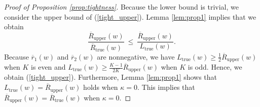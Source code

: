 \documentclass[12pt,a4paper]{article}
\begin{document}
\begin{proof}[Proof of Proposition \ref{prop:tightness}]
Because the lower bound is trivial, we consider the upper bound of (\ref{tight_upper}). Lemma \ref{lem:prop1} implies that we obtain
\begin{equation*}
\frac{\overline{R}_{\mathrm{upper}}(w)}{\overline{R}_{\mathrm{true}}(w)} \ \leq \ \frac{\overline{R}_{\mathrm{upper}}(w)}{L_{\mathrm{true}}(w)}.
\end{equation*}
Because $\overline{r}_1(w)$ and $\overline{r}_2(w)$ are nonnegative, we have $L_{\mathrm{true}}(w) \geq \frac{1}{2} \overline{R}_{\mathrm{upper}}(w)$ when $K$ is even and $L_{\mathrm{true}}(w) \geq \frac{K-1}{2K} \overline{R}_{\mathrm{upper}}(w)$ when $K$ is odd. Hence, we obtain (\ref{tight_upper}). Furthermore, Lemma \ref{lem:prop1} shows that $L_{\mathrm{true}}(w) = \overline{R}_{\mathrm{upper}}(w)$ holds when $\kappa = 0$. This implies that $\overline{R}_{\mathrm{upper}}(w) = \overline{R}_{\mathrm{true}}(w)$ when $\kappa = 0$.
\end{proof}\vspace{0.1in}
\end{document}
